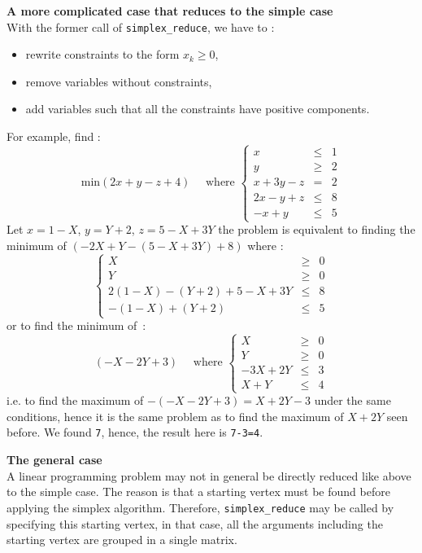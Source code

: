 \documentclass[a4paper,11pt]{book}
\begin{document}
{\bf A more complicated case that reduces to the simple case}\\
With the former call of {\tt simplex\_reduce}, we have to :
\begin{itemize}
\item rewrite constraints to the form $x_k \geq 0$,
\item remove variables without constraints,
\item add variables such that all the constraints have positive components.
\end{itemize}
For example, find :
\begin{equation}\label{eq:lpexample}
\mbox{min}(2x+y-z+4)  \quad \mbox{ where }
\left\{
\begin{array}{rcl}
x & \leq & 1 \\
y & \geq & 2 \\
x+3y-z & = & 2 \\
2x-y+z & \leq & 8\\
-x+y & \leq & 5
\end{array}
\right.
\end{equation}
Let $x=1-X$, $y=Y+2$, $z=5-X+3Y$
the problem is equivalent to finding the minimum of
$(-2X+Y-(5-X+3Y)+8)$
where :
\[
\left\{
\begin{array}{rcl}
X & \geq & 0 \\
Y & \geq & 0 \\
2(1-X)-(Y+2)+ 5-X+3Y & \leq & 8\\
-(1-X) +(Y+2)  & \leq & 5
\end{array}
\right.
\]
or to find the minimum of~:
\[ (-X-2Y+3) \quad \mbox{ where }
\left\{
\begin{array}{rcl}
X & \geq & 0 \\
Y & \geq & 0 \\
-3X+2Y & \leq & 3\\
X +Y  & \leq & 4
\end{array}
\right.
\]
i.e. to find the maximum of $-(-X-2Y+3)=X+2Y-3$
under the same conditions, hence it is the same problem as
to find the maximum of $X+2Y$ seen before. We found {\tt 7},
hence, the result here is {\tt 7-3=4}.

{\bf The general case}\\
A linear programming problem may not in general be directly
reduced like above to the simple case. The reason is that
a starting vertex must be found before applying the simplex
algorithm. Therefore,
{\tt simplex\_reduce} may be called by specifying this starting
vertex, in that case, all the arguments including the starting
vertex are grouped in a single matrix.
\end{document}
